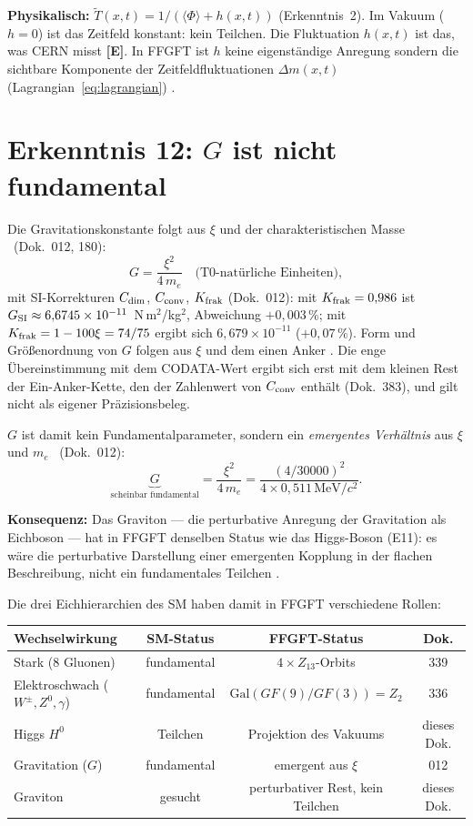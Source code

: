 \textbf{Physikalisch:} $\tilde{T}(x,t) = 1/(\langle\Phi\rangle + h(x,t))$
(Erkenntnis~2). Im Vakuum ($h = 0$) ist das Zeitfeld konstant: kein Teilchen.
Die Fluktuation $h(x,t)$ ist das, was CERN misst \textbf{[E]}. In FFGFT ist $h$ keine
eigenständige Anregung sondern die sichtbare Komponente der Zeitfeldfluktuationen
$\Delta m(x,t)$ (Lagrangian~\eqref{eq:lagrangian}) \BM.

\section{Erkenntnis 12: $G$ ist nicht fundamental}

Die Gravitationskonstante folgt aus $\xi$ und der charakteristischen Masse \KM\
(Dok.~012, 180):
\begin{equation}
  G = \frac{\xi^2}{4\,m_e}
  \quad\text{(T0-natürliche Einheiten)},
  \label{eq:G_from_xi}
\end{equation}
mit SI-Korrekturen $C_{\rm dim}$, $C_{\rm conv}$, $K_{\rm frak}$
(Dok.~012): mit $K_{\rm frak} = 0{,}986$ ist $G_{\rm SI} \approx 6{,}6745\times10^{-11}$~N\,m$^2$/kg$^2$,
Abweichung $+0{,}003\,\%$; mit $K_{\rm frak} = 1-100\xi = 74/75$
ergibt sich $6{,}679\times10^{-11}$ ($+0{,}07\,\%$). Form und Größenordnung von
$G$ folgen aus $\xi$ und dem einen Anker \KM. Die enge Übereinstimmung mit dem
CODATA-Wert ergibt sich erst mit dem kleinen Rest der Ein-Anker-Kette, den der
Zahlenwert von $C_{\rm conv}$ enthält (Dok.~383), und gilt nicht als eigener
Präzisionsbeleg.

$G$ ist damit kein Fundamentalparameter, sondern ein \emph{emergentes
Verhältnis} aus $\xi$ und $m_e$ \KM\ (Dok.~012):
\begin{equation}
  \underbrace{G}_{\text{scheinbar fundamental}}
  = \frac{\xi^2}{4\,m_e}
  = \frac{(4/30000)^2}{4\times 0{,}511\,\text{MeV}/c^2}.
  \label{eq:G_emergent}
\end{equation}

\textbf{Konsequenz:} Das Graviton --- die perturbative Anregung der Gravitation
als Eichboson --- hat in FFGFT denselben Status wie das Higgs-Boson (E11):
es wäre die perturbative Darstellung einer emergenten Kopplung in der flachen
Beschreibung, nicht ein fundamentales Teilchen \BM.

Die drei Eichhierarchien des SM haben damit in FFGFT verschiedene Rollen:
\begin{center}\small
\begin{tabular}{@{}lccc@{}}
\toprule
Wechselwirkung & SM-Status & FFGFT-Status & Dok. \\
\midrule
Stark (8 Gluonen) & fundamental & $4\times Z_{13}$-Orbits \BM & 339 \\
Elektroschwach ($W^\pm,Z^0,\gamma$) & fundamental & $\text{Gal}(GF(9)/GF(3))=Z_2$ \KM & 336 \\
Higgs $H^0$ & Teilchen & Projektion des Vakuums \BM & dieses Dok. \\
Gravitation ($G$) & fundamental & emergent aus $\xi$ \KM & 012 \\
Graviton & gesucht & perturbativer Rest, kein Teilchen \BM & dieses Dok. \\
\bottomrule
\end{tabular}
\end{center}

